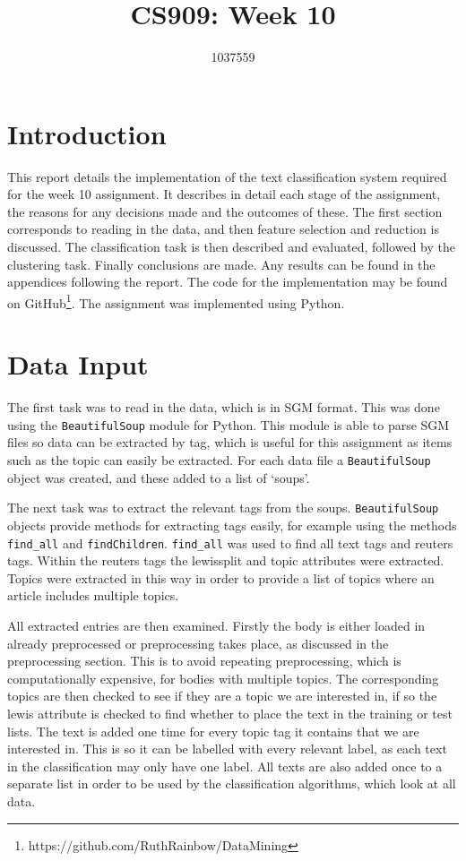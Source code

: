 \documentclass{article}
\title{CS909: Week 10}
\author{1037559}
\date{}
\begin{document}
\maketitle

\section{Introduction}
This report details the implementation of the text classification system required for the week 10 assignment. It describes in detail each stage of the assignment, the reasons for any decisions made and the outcomes of these. The first section corresponds to reading in the data, and then feature selection and reduction is discussed. The classification task is then described and evaluated, followed by the clustering task. Finally conclusions are made. Any results can be found in the appendices following the report. The code for the implementation may be found on GitHub\footnote{https://github.com/RuthRainbow/DataMining}. The assignment was implemented using Python.

\section{Data Input}
The first task was to read in the data, which is in SGM format. This was done using the \verb|BeautifulSoup| module for Python. This module is able to parse SGM files so data can be extracted by tag, which is useful for this assignment as items such as the topic can easily be extracted. For each data file a \verb|BeautifulSoup| object was created, and these added to a list of `soups'.

The next task was to extract the relevant tags from the soups. \verb|BeautifulSoup| objects provide methods for extracting tags easily, for example using the methods \verb|find_all| and \verb|findChildren|. \verb|find_all| was used to find all text tags and reuters tags. Within the reuters tags the lewissplit and topic attributes were extracted. Topics were extracted in this way in order to provide a list of topics where an article includes multiple topics.

All extracted entries are then examined. Firstly the body is either loaded in already preprocessed or preprocessing takes place, as discussed in the preprocessing section. This is to avoid repeating preprocessing, which is computationally expensive, for bodies with multiple topics. The corresponding topics are then checked to see if they are a topic we are interested in, if so the lewis attribute is checked to find whether to place the text in the training or test lists. The text is added one time for every topic tag it contains that we are interested in. This is so it can be labelled with every relevant label, as each text in the classification may only have one label. All texts are also added once to a separate list in order to be used by the classification algorithms, which look at all data.
\end{document}
